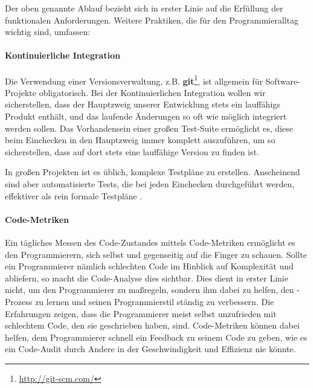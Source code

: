 Der oben genannte Ablauf bezieht sich in erster Linie auf die Erfüllung der funktionalen Anforderungen. Weitere Praktiken, die für den Programmieralltag wichtig sind, umfassen:

\paragraph{Kontinuierliche Integration} Die Verwendung einer Versionsverwaltung, z.B. \textbf{git}\footnote{\url{http://git-scm.com/}}, ist allgemein für Software-Projekte obligatorisch. Bei der Kontinuierlichen Integration wollen wir sicherstellen, dass der Hauptzweig unserer Entwicklung stets ein lauffähigs Produkt enthält, und das laufende Änderungen so oft wie möglich integriert werden sollen. Das Vorhandensein einer großen Test-Suite ermöglicht es, diese beim Einchecken in den Hauptzweig immer komplett auszuführen, um so sicherstellen, dass auf dort stets eine lauffähige Version zu finden ist.

In großen Projekten ist es üblich, komplexe Testpläne zu erstellen. Anscheinend sind aber automatisierte Tests, die bei jeden Einchecken durchgeführt werden, effektiver als rein formale Testpläne \citep[S. 238]{hunt_pragmatic_1999}.

\paragraph{Code-Metriken} Ein tägliches Messen des Code-Zustandes mittels Code-Metriken ermöglicht es den Programmierern, sich selbst und gegenseitig auf die Finger zu schauen. Sollte ein Programmierer nämlich schlechten Code im Hinblick auf Komplexität und  abliefern, so macht die Code-Analyse dies sichtbar. Dies dient in erster Linie nicht, um den Programmierer zu maßregeln, sondern ihm dabei zu helfen, den -Prozess zu lernen und seinen Programmierstil ständig zu verbessern. Die Erfahrungen zeigen, dass die Programmierer meist selbst unzufrieden mit schlechtem Code, den sie geschrieben haben, sind. Code-Metriken können dabei helfen, dem Programmierer schnell ein Feedback zu seinem Code zu geben, wie es ein Code-Audit durch Andere in der Geschwindigkeit und Effizienz nie könnte.

